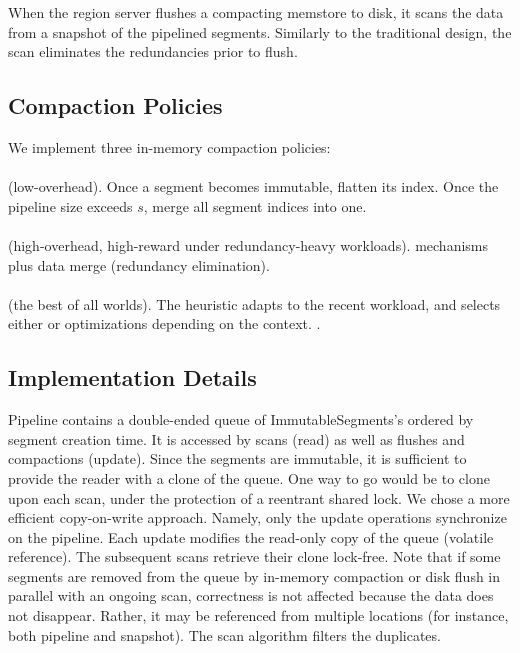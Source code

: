 When the region server flushes a compacting memstore to disk, it scans the data from a snapshot 
of the pipelined segments. Similarly to the traditional design, the scan eliminates the redundancies 
prior to flush. 
 

\subsection{Compaction Policies}
\label{sec:policies}

We implement three in-memory compaction policies: 
\paragraph{\basic} (low-overhead). Once a segment becomes immutable, flatten its index. Once the pipeline size exceeds $s$, 
merge all segment indices into one.  
\paragraph{\eager} (high-overhead, high-reward under redundancy-heavy workloads). 
\basic\/ mechanisms plus data merge (redundancy elimination).
\paragraph{\adp} (the best of all worlds). The heuristic adapts to the recent workload, and selects either \basic\/ 
or \eager\/ optimizations depending on the context. . 

\subsection{Implementation Details}
Pipeline contains a double-ended queue of ImmutableSegments’s ordered by segment creation time. It is accessed by scans (read) as well as flushes and compactions (update). Since the segments are immutable, it is sufficient to provide the reader with a clone of the queue. One way to go would be to clone upon each scan, under the protection of a reentrant shared lock. We chose a more efficient copy-on-write approach. Namely, only the update operations synchronize on the pipeline. Each update modifies the read-only copy of the queue (volatile reference). The subsequent scans retrieve their clone lock-free. Note that if some segments are removed from the queue by in-memory compaction or disk flush in parallel with an ongoing scan, correctness is not affected because the data does not disappear. Rather, it may be referenced from multiple locations (for instance, both pipeline and snapshot). The scan algorithm filters the duplicates. 

